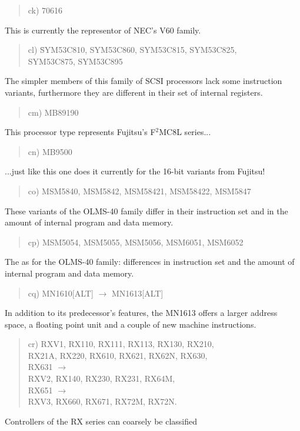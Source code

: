 \documentclass[12pt,twoside]{report}
\begin{document}
\begin{quote}
ck) 70616
\end{quote}
This is currently the representor of NEC's V60 family.
\begin{quote}
\begin{tabbing}
cl) \= SYM53C810, SYM53C860, SYM53C815, SYM53C825, \\
    \> SYM53C875, SYM53C895
\end{tabbing}
\end{quote}
The simpler members of this family of SCSI processors lack some
instruction variants, furthermore they are different in their set of
internal registers.
\begin{quote}
cm) MB89190
\end{quote}
This processor type represents Fujitsu's F$^{2}$MC8L series...
\begin{quote}
cn) MB9500
\end{quote}
...just like this one does it currently for the 16-bit variants from
Fujitsu!
\begin{quote}
co) MSM5840, MSM5842, MSM58421, MSM58422, MSM5847
\end{quote}
These variants of the OLMS-40 family differ in their instruction
set and in the amount of internal program and data memory.
\begin{quote}
cp) MSM5054, MSM5055, MSM5056, MSM6051, MSM6052
\end{quote}
The as for the OLMS-40 family: differences in instruction
set and the amount of internal program and data memory.
\begin{quote}
cq) MN1610[ALT] $\rightarrow$ MN1613[ALT]
\end{quote}
In addition to its predecessor's features, the MN1613 offers a larger
address space, a floating point unit and a couple of new machine
instructions.
\begin{quote}
cr) RXV1, RX110, RX111, RX113, RX130, RX210,\\
    RX21A, RX220, RX610, RX621, RX62N, RX630,\\
    RX631 $\longrightarrow$ \\
    RXV2, RX140, RX230, RX231, RX64M,\\
    RX651 $\longrightarrow$ \\
    RXV3, RX660, RX671, RX72M, RX72N.\\
\end{quote}
Controllers of the RX series can coarsely be classified
\end{document}
